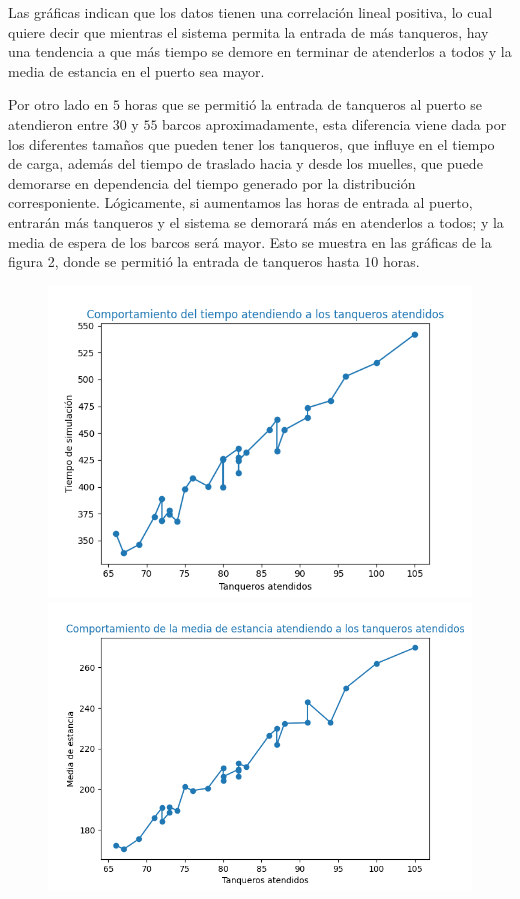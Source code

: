 \documentclass[twoside]{article}
\begin{document}
Las gr\'aficas indican que los datos tienen una correlaci\'on lineal positiva, lo cual quiere decir que mientras el sistema permita la entrada de m\'as tanqueros, hay una tendencia a que m\'as tiempo se demore en terminar de atenderlos a todos y la media de estancia en el puerto sea mayor.

Por otro lado en $5$ horas que se permiti\'o la entrada de tanqueros al puerto se atendieron entre $30$ y $55$ barcos aproximadamente, esta diferencia viene dada por los diferentes tama\~nos que pueden tener los tanqueros, que influye en el tiempo de carga, adem\'as del tiempo de traslado hacia y desde los muelles, que puede demorarse en dependencia del tiempo generado por la distribuci\'on corresponiente. L\'ogicamente, si aumentamos las horas de entrada al puerto, entrar\'an m\'as tanqueros y el sistema se demorar\'a m\'as en atenderlos a todos; y la media de espera de los barcos ser\'a mayor. Esto se muestra en las gr\'aficas de la figura 2, donde se permiti\'o la entrada de tanqueros hasta $10$ horas.

\begin{figure}[h]

\includegraphics[scale = 0.39]{img/Figure_3.png}
\includegraphics[scale=0.39]{img/Figure_4.png}
\caption{}

\end{figure} 
\end{document}
